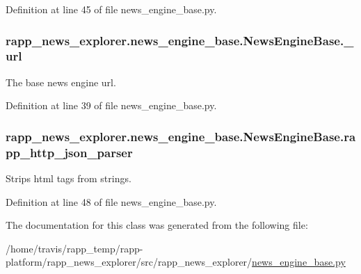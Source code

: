 Definition at line 45 of file news\-\_\-engine\-\_\-base.\-py.

\hypertarget{classrapp__news__explorer_1_1news__engine__base_1_1NewsEngineBase_af60c108531498c4b24469f00d5c2c84e}{
\subsubsection[{\-\_\-url}]{\setlength{\rightskip}{0pt plus 5cm}rapp\-\_\-news\-\_\-explorer.\-news\-\_\-engine\-\_\-base.\-News\-Engine\-Base.\-\_\-url\hspace{0.3cm}{\ttfamily [private]}}}\label{classrapp__news__explorer_1_1news__engine__base_1_1NewsEngineBase_af60c108531498c4b24469f00d5c2c84e}


The base news engine url. 



Definition at line 39 of file news\-\_\-engine\-\_\-base.\-py.

\hypertarget{classrapp__news__explorer_1_1news__engine__base_1_1NewsEngineBase_ad1fe3e8243ed542c6daae881a67bdd46}{
\subsubsection[{rapp\-\_\-http\-\_\-json\-\_\-parser}]{\setlength{\rightskip}{0pt plus 5cm}rapp\-\_\-news\-\_\-explorer.\-news\-\_\-engine\-\_\-base.\-News\-Engine\-Base.\-rapp\-\_\-http\-\_\-json\-\_\-parser}}\label{classrapp__news__explorer_1_1news__engine__base_1_1NewsEngineBase_ad1fe3e8243ed542c6daae881a67bdd46}


Strips html tags from strings. 



Definition at line 48 of file news\-\_\-engine\-\_\-base.\-py.



The documentation for this class was generated from the following file\-:\begin{DoxyCompactItemize}
\item 
/home/travis/rapp\-\_\-temp/rapp-\/platform/rapp\-\_\-news\-\_\-explorer/src/rapp\-\_\-news\-\_\-explorer/\hyperlink{news__engine__base_8py}{news\-\_\-engine\-\_\-base.\-py}\end{DoxyCompactItemize}
